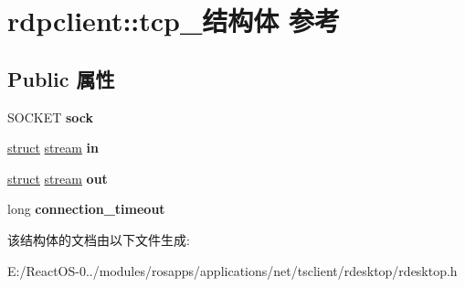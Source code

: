 \hypertarget{structrdpclient_1_1tcp__}{}\section{rdpclient\+:\+:tcp\+\_\+结构体 参考}
\label{structrdpclient_1_1tcp__}
\subsection*{Public 属性}
\begin{DoxyCompactItemize}
\item 
\mbox{\label{structrdpclient_1_1tcp___a7ec49d85dd8f1581c9403605f8b40ab9}} 
S\+O\+C\+K\+ET {\bfseries sock}
\item 
\mbox{\label{structrdpclient_1_1tcp___ac86f8c061093031eeec7574dd4cce9a8}} 
\hyperlink{interfacestruct}{struct} \hyperlink{structstream}{stream} {\bfseries in}
\item 
\mbox{\label{structrdpclient_1_1tcp___a1c3433f4f88ffba27b1c13f4092eb107}} 
\hyperlink{interfacestruct}{struct} \hyperlink{structstream}{stream} {\bfseries out}
\item 
\mbox{\label{structrdpclient_1_1tcp___ae2f2167c93151d72e33e2dfb5584577e}} 
long {\bfseries connection\+\_\+timeout}
\end{DoxyCompactItemize}


该结构体的文档由以下文件生成\+:\begin{DoxyCompactItemize}
\item 
E\+:/\+React\+O\+S-\/0../modules/rosapps/applications/net/tsclient/rdesktop/rdesktop.\+h\end{DoxyCompactItemize}
